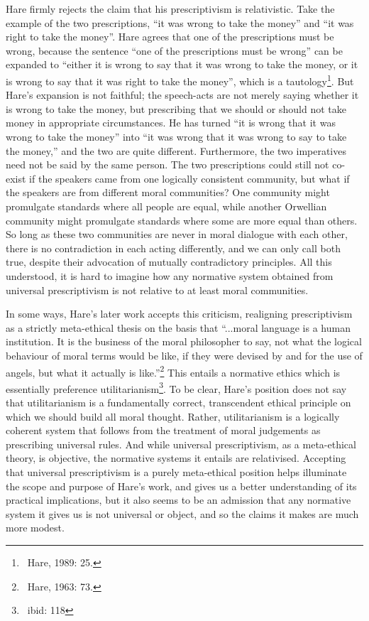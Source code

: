 \documentclass[12pt]{article}
\begin{document}
Hare firmly rejects the claim that his prescriptivism is relativistic. Take the example of the two prescriptions, ``it was wrong to take the money'' and ``it was right to take the money''. Hare agrees that one of the prescriptions must be wrong, because the sentence ``one of the prescriptions must be wrong'' can be expanded to ``either it is wrong to say that it was wrong to take the money, or it is wrong to say that it was right to take the money'', which is a tautology\footnote{~Hare, 1989: 25.}. But Hare's expansion is not faithful; the speech-acts are not merely saying whether it is wrong to take the money, but prescribing that we should or should not take money in appropriate circumstances. He has turned ``it is wrong that it was wrong to take the money'' into ``it was wrong that it was wrong to say to take the money,'' and the two are quite different. Furthermore, the two imperatives need not be said by the same person. The two prescriptions could still not co-exist if the speakers came from one logically consistent community, but what if the speakers are from different moral communities? One community might promulgate standards where all people are equal, while another Orwellian community might promulgate standards where some are more equal than others. So long as these two communities are never in moral dialogue with each other, there is no contradiction in each acting differently, and we can only call both true, despite their advocation of mutually contradictory principles. All this understood, it is hard to imagine how any normative system obtained from universal prescriptivism is not relative to at least moral communities.

In some ways, Hare's later work accepts this criticism, realigning prescriptivism as a strictly meta-ethical thesis on the basis that ``...moral language is a human institution. It is the business of the moral philosopher to say, not what the logical behaviour of moral terms would be like, if they were devised by and for the use of angels, but what it actually is like.''\footnote{~Hare, 1963: 73.} This entails a normative ethics which is essentially preference utilitarianism\footnote{~ibid: 118}. To be clear, Hare's position does not say that utilitarianism is a fundamentally correct, transcendent ethical principle on which we should build all moral thought. Rather, utilitarianism is a logically coherent system that follows from the treatment of moral judgements as prescribing universal rules. And while universal prescriptivism, as a meta-ethical theory, is objective, the normative systems it entails are relativised. Accepting that universal prescriptivism is a purely meta-ethical position helps illuminate the scope and purpose of Hare's work, and gives us a better understanding of its practical implications, but it also seems to be an admission that any normative system it gives us is not universal or object, and so the claims it makes are much more modest.
\end{document}
